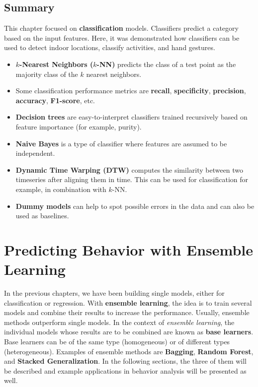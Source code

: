 \documentclass[
  11pt,
]{krantz}
\providecommand{\tightlist}{%
  \setlength{\itemsep}{0pt}\setlength{\parskip}{0pt}}
\begin{document}
\newpage
\FloatBarrier

\hypertarget{summaryClassification}{%
\section{Summary}\label{summaryClassification}}

This chapter focused on \textbf{classification} models. Classifiers predict a category based on the input features. Here, it was demonstrated how classifiers can be used to detect indoor locations, classify activities, and hand gestures.

\begin{itemize}
\tightlist
\item
  \textbf{\(k\)-Nearest Neighbors (\(k\)-NN)} predicts the class of a test point as the majority class of the \(k\) nearest neighbors.
\item
  Some classification performance metrics are \textbf{recall}, \textbf{specificity}, \textbf{precision}, \textbf{accuracy}, \textbf{F1-score}, etc.
\item
  \textbf{Decision trees} are easy-to-interpret classifiers trained recursively based on feature importance (for example, purity).
\item
  \textbf{Naive Bayes} is a type of classifier where features are assumed to be independent.
\item
  \textbf{Dynamic Time Warping (DTW)} computes the similarity between two timeseries after aligning them in time. This can be used for classification for example, in combination with \(k\)-NN.
\item
  \textbf{Dummy models} can help to spot possible errors in the data and can also be used as baselines.
\end{itemize}



\hypertarget{ensemble}{%
\chapter{Predicting Behavior with Ensemble Learning}\label{ensemble}}

In the previous chapters, we have been building single models, either for classification or regression. With \textbf{ensemble learning}, the idea is to train several models and combine their results to increase the performance. Usually, ensemble methods outperform single models. In the context of \emph{ensemble learning}, the individual models whose results are to be combined are known as \textbf{base learners}. Base learners can be of the same type (homogeneous) or of different types (heterogeneous). Examples of ensemble methods are \textbf{Bagging}, \textbf{Random Forest}, and \textbf{Stacked Generalization}. In the following sections, the three of them will be described and example applications in behavior analysis will be presented as well.
\end{document}
